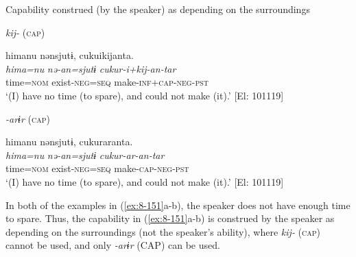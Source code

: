 \ea\label{ex:8-151}
  Capability construed (by the speaker) as depending on the surroundings

\ea \textit{kij-} (\textsc{cap})

  {\TM}
\glll  *himanu  nənsjutɨ,  cukuikijanta.\\
\textit{hima=nu}  \textit{nə-an=sjutɨ}  \textit{cukur-i+kij-an-tar}\\
    time=\textsc{nom}  exist-\textsc{neg}=\textsc{seq}  make-\textsc{inf}+\textsc{cap}-\textsc{neg}-\textsc{pst}\\
‘(I) have no time (to spare), and could not make (it).’ [El: 101119]


\ex \textit{-arɨr} (\textsc{cap})

  {\TM}
\glll  himanu  nənsjutɨ,  cukuraranta.\\
\textit{hima=nu}  \textit{nə-an=sjutɨ}  \textit{cukur-ar-an-tar}\\
    time=\textsc{nom}  exist-\textsc{neg}=\textsc{seq}  make-\textsc{cap}-\textsc{neg}-\textsc{pst}\\
\glt ‘(I) have no time (to spare), and could not make (it).’ [El: 101119]
\z
\z

In both of the examples in (\ref{ex:8-151}a-b), the speaker does not have enough time to spare. Thus, the capability in (\ref{ex:8-151}a-b) is construed by the speaker as depending on the surroundings (not the speaker’s ability), where \textit{kij-} (\textsc{cap}) cannot be used, and only \textit{-arɨr} (CAP) can be used.
